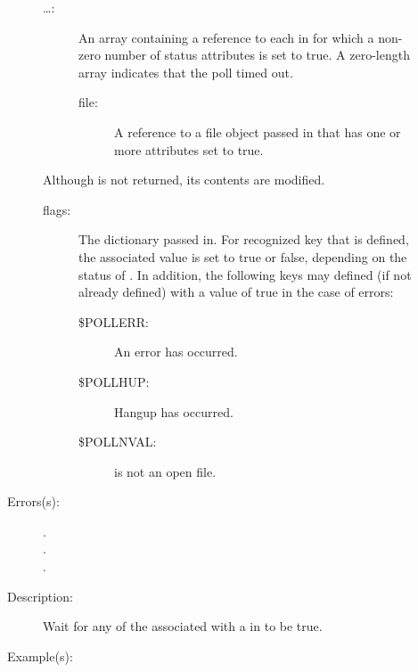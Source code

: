 \begin{description}
\begin{description}
\begin{description}
		\item[{\lb}\dots{\rb}: ]
			An array containing a reference to each  in
			\oparg{{\lt}\dots{\gt}} for which a non-zero number of
			status attributes is set to true.  A zero-length array
			indicates that the poll timed out.
			\begin{description}%
			\item[file: ]
				A reference to a file object passed in that has
				one or more attributes set to true.
			\end{description}
		\end{description}
		Although \oparg{{\lt}\dots{\gt}} is not returned, its contents
		are modified.
		\begin{description}\item[]
		\item[flags: ]
			The dictionary passed in.  For recognized key that is
			defined, the associated value is set to true or false,
			depending on the status of .  In addition,
			the following keys may defined (if not already defined)
			with a value of true in the case of errors:
			\begin{description}%
			\item[\$POLLERR: ]
				An error has occurred.
			\item[\$POLLHUP: ]
				Hangup has occurred.
			\item[\$POLLNVAL: ]
				 is not an open file.
			\end{description}
		\end{description}
	\item[Errors(s): ]
		\begin{description}\item[]
		\item[.]
		\item[.]
		\item[.]
		\end{description}
	\item[Description: ]
		Wait for any of the  associated with a 
		in \oparg{{\lt}\dots{\gt}} to be true.
	\item[Example(s): ]\begin{verbatim}


\end{verbatim}
\end{description}
\end{description}
